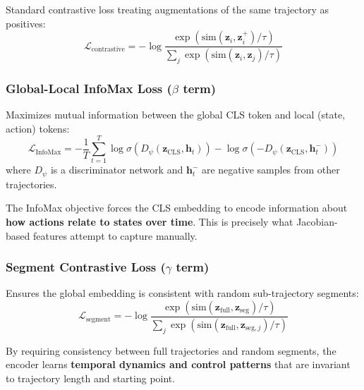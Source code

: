 \documentclass[11pt,a4paper]{article}
\newcommand{\vect}[1]{\mathbf{#1}}
\begin{document}
Standard contrastive loss treating augmentations of the same trajectory as positives:
\begin{equation}
    \mathcal{L}_{\text{contrastive}} = -\log \frac{\exp(\text{sim}(\vect{z}_i, \vect{z}_i^+) / \tau)}{\sum_{j} \exp(\text{sim}(\vect{z}_i, \vect{z}_j) / \tau)}
\end{equation}

\subsubsection{Global-Local InfoMax Loss ($\beta$ term)}

Maximizes mutual information between the global CLS token and local (state, action) tokens:
\begin{equation}
    \mathcal{L}_{\text{InfoMax}} = -\frac{1}{T} \sum_{t=1}^{T} \log \sigma\left( D_\psi(\vect{z}_{\text{CLS}}, \vect{h}_t) \right) - \log \sigma\left( -D_\psi(\vect{z}_{\text{CLS}}, \vect{h}_t^-) \right)
\end{equation}
where $D_\psi$ is a discriminator network and $\vect{h}_t^-$ are negative samples from other trajectories.

\begin{tcolorbox}[colback=green!5,colframe=green!40!black,title=Key Insight: InfoMax Captures Dynamics]
The InfoMax objective forces the CLS embedding to encode information about \textbf{how actions relate to states over time}. This is precisely what Jacobian-based features attempt to capture manually.
\end{tcolorbox}

\subsubsection{Segment Contrastive Loss ($\gamma$ term)}

Ensures the global embedding is consistent with random sub-trajectory segments:
\begin{equation}
    \mathcal{L}_{\text{segment}} = -\log \frac{\exp(\text{sim}(\vect{z}_{\text{full}}, \vect{z}_{\text{seg}}) / \tau)}{\sum_{j} \exp(\text{sim}(\vect{z}_{\text{full}}, \vect{z}_{\text{seg},j}) / \tau)}
\end{equation}

\begin{tcolorbox}[colback=yellow!5,colframe=yellow!40!black,title=Key Insight: Segment Loss Captures Temporal Patterns]
By requiring consistency between full trajectories and random segments, the encoder learns \textbf{temporal dynamics and control patterns} that are invariant to trajectory length and starting point.
\end{tcolorbox}
\end{document}
